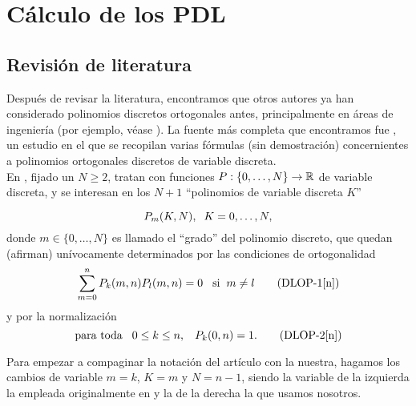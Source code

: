 \chapter{Cálculo de los PDL}

\section{Revisión de literatura}
Después de revisar la literatura, encontramos que
otros autores ya han considerado polinomios discretos ortogonales
antes, principalmente en áreas de ingeniería (por ejemplo, 
véase \cite{papel}
). La fuente más completa que encontramos 
fue \cite{Neuman}, un estudio en el que se recopilan 
varias fórmulas (sin demostración) concernientes a polinomios
ortogonales discretos de variable discreta. \\

En \cite{Neuman}, 
fijado un $N \geq 2$,
tratan con funciones $P : \{0, \ldots , N \} \rightarrow \mathbb{R}$
de variable discreta, y 
se interesan en los $N+1$ ``polinomios de variable
discreta $K$''

\[
P_{m}(K, N), \hspace{0.2cm} K=0, \ldots , N,
\]
donde $m \in \{0, \ldots, N \}$ es llamado el ``grado''
del polinomio discreto, que quedan (afirman)
unívocamente determinados por las condiciones
de ortogonalidad
\begin{equation}
\sum\limits_{m=0}^{n}P_{k}(m,n) P_{l}(m,n) =0
\hspace{0.3cm} \text{si} \hspace{0.2cm} m \neq l \tag{DLOP-1[n]} \label{eq:dlop1}
\end{equation}
y por la normalización
\begin{equation}
\text{para toda} \hspace{0.3cm} 0 \leq k \leq n, \hspace{0.3cm} P_{k}(0, n)=1.   \tag{DLOP-2[n]} \label{eq:dlop2}
\end{equation}

Para empezar a compaginar la notación
del artículo con la nuestra, 
hagamos
los cambios de variable $m=k$, $K=m$
y $N=n-1$, siendo la variable de la izquierda la empleada
originalmente en
\cite{Neuman} y la de la derecha la que usamos nosotros. \\

